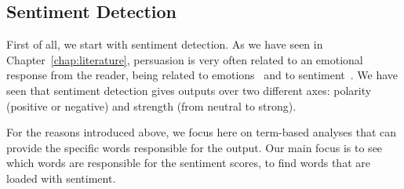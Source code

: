 \subsection{\statusorange Sentiment Detection}
\label{ssec:lp_techniques_sentiment}

First of all, we start with sentiment detection.
As we have seen in Chapter~\ref{chap:literature}, persuasion is very often related to an emotional response from the reader, being related to emotions~\citep{rocklage2018persuasion,petty2015emotion,desteno2004discrete} and to sentiment~\citep{gatti2014sentiment}.
We have seen that sentiment detection gives outputs over two different axes: polarity (positive or negative) and strength (from neutral to strong).

For the reasons introduced above, we focus here on term-based analyses that
can provide the specific words responsible for the output.
Our main focus is to see which words are responsible for the sentiment scores, %
to find words that are loaded with sentiment. %

